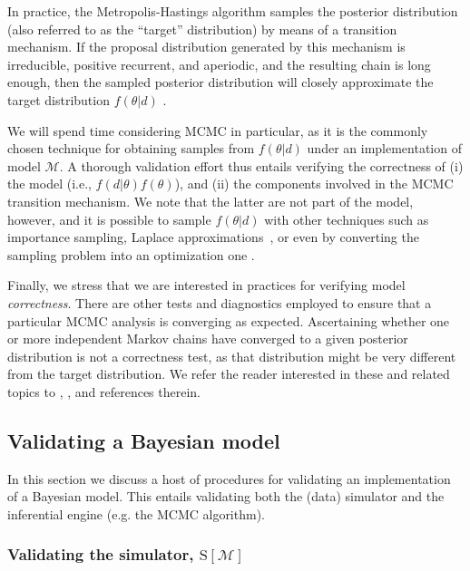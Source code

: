 \documentclass[oneside]{article}
\begin{document}
In practice, the Metropolis-Hastings algorithm samples the posterior
distribution (also referred to as the ``target'' distribution) by means of a
transition mechanism. 
If the proposal distribution generated by this mechanism is irreducible, positive recurrent, and aperiodic, and the resulting chain is long enough, then the sampled posterior distribution will closely approximate the target distribution $f(\theta|d)$ \citep{smith93,tierney94,gelman}.

We will spend time considering MCMC in particular, as it is the commonly chosen technique for obtaining samples from $f(\theta|d)$ under an implementation of model $\mathcal{M}$.
A thorough validation effort thus entails verifying the correctness of (i) the model (i.e., $f(d|\theta)f(\theta)$), and (ii) the components involved in the MCMC transition mechanism.
We note that the latter are not part of the model, however, and it is  possible to sample $f(\theta|d)$ with other techniques such as importance sampling, Laplace approximations~\citep{inla}, or even by converting the sampling problem into an optimization one \citep[e.g.,][]{zhang18}.

Finally, we stress that we are interested in practices for verifying model \emph{correctness}.
There are other tests and diagnostics employed to ensure that a particular MCMC analysis is converging as expected.
Ascertaining whether one or more independent Markov chains have converged to a given posterior distribution is not a correctness test, as that distribution might be very different from the target distribution. 
We refer the reader interested in these and related topics to \cite{rwty}, \cite{fabreti2022},  \cite{magee2023} and references therein.

\subsection*{Validating a Bayesian model}

In this section we discuss a host of procedures for validating an implementation of a Bayesian model.
This entails validating both the (data) simulator and the inferential engine (e.g. the MCMC algorithm).

\subsubsection*{Validating the simulator, $\text{S}[\mathcal{M}]$}
\label{verify-correctness-of-simulator-implementation}
\end{document}

